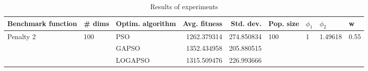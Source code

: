 \begin{table}
\centering
\caption{Results of experiments}
\begin{tabular}{lllrrllll}
\toprule
        Benchmark function &              \# dims & Optim. algorithm &  Avg. fitness &  Std. dev. &            Pop. size &         $\phi_{1}$ &               $\phi_{2}$ &                     w \\
\midrule
\multirow{3}{*}{Penalty 2} & \multirow{3}{*}{100} &              PSO &   1262.379314 & 274.850834 & \multirow{3}{*}{100} & \multirow{3}{*}{1} & \multirow{3}{*}{1.49618} & \multirow{3}{*}{0.55} \\
                           &                      &            GAPSO &   1352.434958 & 205.880515 &                      &                    &                          &                       \\
                           &                      &          LOGAPSO &   1315.509476 & 226.993666 &                      &                    &                          &                       \\
\bottomrule
\end{tabular}
\end{table}
